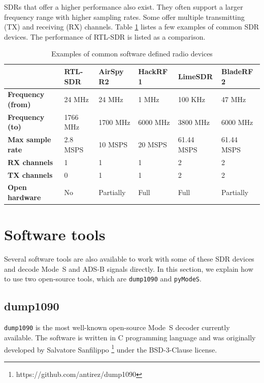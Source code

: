 SDRs that offer a higher performance also exist. They often support a larger frequency range with higher sampling rates. Some offer multiple transmitting (TX) and receiving (RX) channels. Table \ref{tb:sdr} listes a few examples of common SDR devices. The performance of RTL-SDR is listed as a comparison.

\begin{table}[ht]
  \footnotesize
  \caption{Examples of common software defined radio devices}
  \label{tb:sdr}
  \begin{tabular}{|l|l|l|l|l|l|}
  \hline
   & \textbf{RTL-SDR} & \textbf{AirSpy R2} & \textbf{HackRF 1} & \textbf{LimeSDR} & \textbf{BladeRF 2} \\ \hline
  \textbf{Frequency (from)} & 24 MHz & 24 MHz & 1 MHz & 100 KHz & 47 MHz \\ \hline
  \textbf{Frequency (to)} & 1766 MHz & 1700 MHz & 6000 MHz & 3800 MHz & 6000 MHz \\ \hline
  \textbf{Max sample rate} & 2.8 MSPS & 10 MSPS & 20 MSPS & 61.44 MSPS & 61.44 MSPS \\ \hline
  \textbf{RX channels} & 1 & 1 & 1 & 2 & 2 \\ \hline
  \textbf{TX channels} & 0 & 1 & 1 & 2 & 2 \\ \hline
  \textbf{Open hardware} & No & Partially & Full & Full & Partially \\ \hline
  \end{tabular}
\end{table}

\section{Software tools}

Several software tools are also available to work with some of these SDR devices and decode Mode~S and ADS-B signals directly. In this section, we explain how to use two open-source tools, which are \texttt{dump1090} and \texttt{pyModeS}.

\subsection{dump1090}

\texttt{dump1090} is the most well-known open-source Mode~S decoder currently available. The software is written in C programming language and was originally developed by Salvatore Sanfilippo \footnote{https://github.com/antirez/dump1090} under the BSD-3-Clause license.

